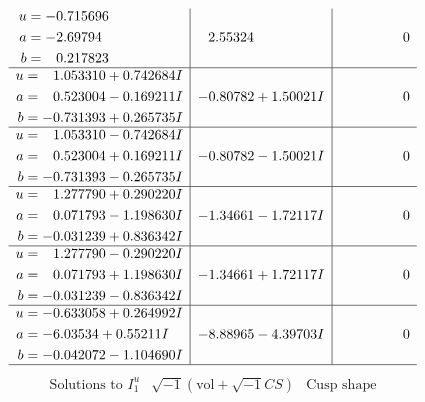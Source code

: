 \documentclass[1p]{elsarticle_modified}
\theoremstyle{definition}
\newcommand{\I}{\sqrt{-1}}
\begin{document}
$$\begin{array}{c|c|c}
\begin{aligned}
u &= -0.715696\phantom{ +0.000000I} \\
a &= -2.69794\phantom{ +0.000000I} \\
b &= \phantom{-}0.217823\phantom{ +0.000000I}\end{aligned}
 & \phantom{-}2.55324\phantom{ +0.000000I} & \phantom{-0.000000 } 0 \\ \hline\begin{aligned}
u &= \phantom{-}1.053310 + 0.742684 I \\
a &= \phantom{-}0.523004 - 0.169211 I \\
b &= -0.731393 + 0.265735 I\end{aligned}
 & -0.80782 + 1.50021 I & \phantom{-0.000000 } 0 \\ \hline\begin{aligned}
u &= \phantom{-}1.053310 - 0.742684 I \\
a &= \phantom{-}0.523004 + 0.169211 I \\
b &= -0.731393 - 0.265735 I\end{aligned}
 & -0.80782 - 1.50021 I & \phantom{-0.000000 } 0 \\ \hline\begin{aligned}
u &= \phantom{-}1.277790 + 0.290220 I \\
a &= \phantom{-}0.071793 - 1.198630 I \\
b &= -0.031239 + 0.836342 I\end{aligned}
 & -1.34661 - 1.72117 I & \phantom{-0.000000 } 0 \\ \hline\begin{aligned}
u &= \phantom{-}1.277790 - 0.290220 I \\
a &= \phantom{-}0.071793 + 1.198630 I \\
b &= -0.031239 - 0.836342 I\end{aligned}
 & -1.34661 + 1.72117 I & \phantom{-0.000000 } 0 \\ \hline\begin{aligned}
u &= -0.633058 + 0.264992 I \\
a &= -6.03534 + 0.55211 I \\
b &= -0.042072 - 1.104690 I\end{aligned}
 & -8.88965 - 4.39703 I & \phantom{-0.000000 } 0\\
 \hline 
 \end{array}$$\newpage$$\begin{array}{c|c|c}  
\text{Solutions to }I^u_{1}& \I (\text{vol} + \sqrt{-1}CS) & \text{Cusp shape}\\
 \hline 
\begin{aligned}

\end{aligned}
\end{array}$$
\end{document}
